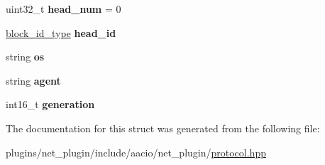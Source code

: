 \begin{DoxyCompactItemize}
\item 
\mbox{\label{structaacio_1_1handshake__message_a281d9394fe89937467cfc939d84dd8c8}} 
uint32\+\_\+t {\bfseries head\+\_\+num} = 0
\item 
\mbox{\label{structaacio_1_1handshake__message_af02fd841eb38f264958fe8bb1dd44f69}} 
\mbox{\hyperlink{classfc_1_1sha256}{block\+\_\+id\+\_\+type}} {\bfseries head\+\_\+id}
\item 
\mbox{\label{structaacio_1_1handshake__message_a159e677900d8225400e7c3c394137e7b}} 
string {\bfseries os}
\item 
\mbox{\label{structaacio_1_1handshake__message_a603addccda1c28d1cfb82b541ed3f604}} 
string {\bfseries agent}
\item 
\mbox{\label{structaacio_1_1handshake__message_ad3cb7c90021ee2a074e1a1cd5f9334cc}} 
int16\+\_\+t {\bfseries generation}
\end{DoxyCompactItemize}


The documentation for this struct was generated from the following file\+:\begin{DoxyCompactItemize}
\item 
plugins/net\+\_\+plugin/include/aacio/net\+\_\+plugin/\mbox{\hyperlink{plugins_2net__plugin_2include_2aacio_2net__plugin_2protocol_8hpp}{protocol.\+hpp}}\end{DoxyCompactItemize}
